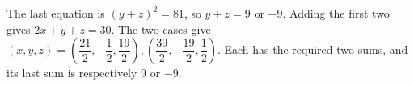 The last equation is $(y+z)^2=81$, so $y+z=9$ or $-9$. Adding the first two gives $2x+y+z=30$. The two cases give $(x,y,z)=\boxed{(\dfrac{21}{2},-\dfrac{1}{2},\dfrac{19}{2}),(\dfrac{39}{2},-\dfrac{19}{2},\dfrac{1}{2})}$. Each has the required two sums, and its last sum is respectively 9 or $-9$.
